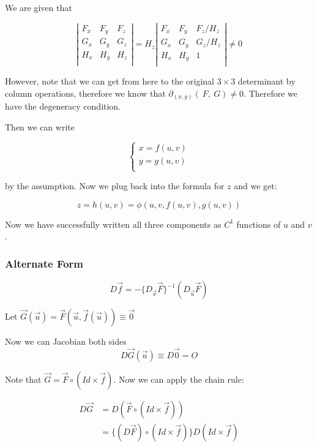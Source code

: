 \documentclass[11 pt, twoside]{article}
\begin{document}
We are given that

\[
\left|\begin{array}{ccc}
F_x & F_y & F_z \\
G_x & G_y & G_z \\
H_x & H_y & H_z \\
\end{array}\right| = H_z
\left|\begin{array}{ccc}
F_x & F_y & F_z/H_z \\
G_x & G_y & G_z/H_z \\
H_x & H_y & 1 \\
\end{array}\right|\neq 0
\]

However, note that we can get from here to the original $3 \times 3$ determinant
by column operations, therefore we know that $\partial_{(x, y)}(~F, ~G)
\neq 0$. Therefore we have the degeneracy condition.

Then we can write

\[
\begin{cases}
x = f(u, v) \\
y = g(u, v) \\
\end{cases}
\]

by the assumption. Now we plug back into the formula for $z$ and we get:

$$z = h(u, v) = \phi(u, v, f(u, v), g(u, v))$$

Now we have successfully written all three components as $C^1$ functions of $u$
and $v$.

\subsubsection{Alternate Form}

$$D \vec{f} = -\{D_{\vec{x}} \vec{F}\}^{-1} (D_{\vec{u}} \vec{F})$$

Let $\vec{G}(\vec{u}) = \vec{F}(\vec{u}, \vec{f}(\vec{u})) \equiv \vec{0}$

Now we can Jacobian both sides
$$D\vec{G}(\vec{u}) \equiv D\vec{0} = O$$

Note that $\vec{G} = \vec{F} \circ (Id \times \vec{f})$. Now we can apply the
chain rule:

\begin{align*}
D\vec{G} &= D(\vec{F} \circ (Id \times \vec{f}))\\
&= \{(D\vec{F}) \circ (Id \times \vec{f})\} D(Id \times \vec{f})\\
\end{align*}
\end{document}
